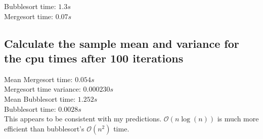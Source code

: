 \documentclass[20pt]{article} %
\begin{document}
Bubblesort time: $1.3s$ \\ 
Mergesort time:  $0.07s$

\subsection{Calculate the sample mean and variance for the cpu times after 100 iterations}
Mean Mergesort time: $0.054s$ \\
Mergesort time variance: $0.000230s$ \\
Mean Bubblesort time: $1.252s$ \\
Bubblesort time: $0.0028s$ \\

This appears to be consistent with my predictions. $\mathcal{O}(n\log(n))$ is much more efficient than bubblesort's $\mathcal{O}(n^{2})$ time.  
\end{document}
